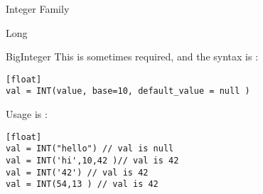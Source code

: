 \begin{section}{Integer Family}
\begin{subsection}{Long}
\end{subsection}

\begin{subsection}{BigInteger}
This is sometimes required, and the syntax is :

\begin{lstlisting}[style=JexlStyle][float]
val = INT(value, base=10, default_value = null )
\end{lstlisting}

Usage is :

\begin{lstlisting}[style=JexlStyle][float]
val = INT("hello") // val is null
val = INT('hi',10,42 )// val is 42
val = INT('42') // val is 42 
val = INT(54,13 ) // val is 42 
\end{lstlisting}

\end{subsection}
\end{section}


